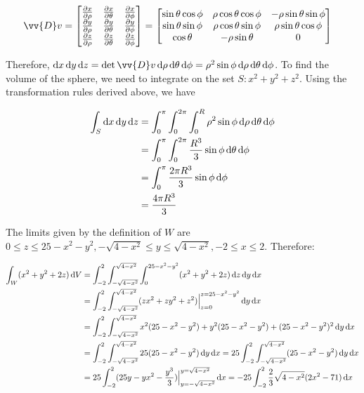 \begin{align*}
  \vv{D}v = \begin{bmatrix}
    \frac{\partial x}{\partial \rho} & \frac{\partial x}{\partial \theta} & \frac{\partial x}{\partial \phi} \\
    \frac{\partial y}{\partial \rho} & \frac{\partial y}{\partial \theta} & \frac{\partial y}{\partial \phi} \\
    \frac{\partial z}{\partial \rho} & \frac{\partial z}{\partial \theta} & \frac{\partial z}{\partial \phi}
  \end{bmatrix}
  &=
  \begin{bmatrix}
    \sin\theta \cos\phi & \rho \cos\theta \cos\phi & -\rho \sin\theta \sin\phi \\
    \sin\theta \sin\phi & \rho \cos\theta \sin\phi & \rho \sin\theta \cos\phi \\
    \cos\theta & -\rho \sin\theta & 0
  \end{bmatrix}
\end{align*}

Therefore, $\diff x \diff y \diff z = \detm \vv{D}v \diff \rho \diff \theta \diff \phi = \rho^2 \sin\phi \diff \rho \diff \theta \diff \phi$. To find the volume of the sphere, we need to integrate on the set $S: x^2 + y^2 + z^2$. Using the transformation rules derived above, we have

\begin{align*}
  \int_S \diff x \diff y \diff z &= \int_0^{\pi} \int_0^{2\pi} \int_0^R \rho^2 \sin\phi \diff \rho \diff \theta \diff \phi \\
  &= \int_0^{\pi} \int_0^{2\pi} \frac{R^3}{3} \sin\phi \diff \theta \diff \phi \\
  &= \int_0^{\pi} \frac{2\pi R^3}{3} \sin\phi \diff \phi \\
  &= \frac{4\pi R^3}{3}
\end{align*}


The limits given by the definition of $W$ are $0 \leq z \leq 25 - x^2 - y^2, -\sqrt{4 - x^2} \leq y \leq \sqrt{4 - x^2}, -2 \leq x \leq 2$. Therefore:

\begin{align*}
  \int_W (x^2 + y^2 + 2z) \diff V &= \int_{-2}^2 \int_{-\sqrt{4 - x^2}}^{\sqrt{4 - x^2}} \int_0^{25 - x^2 - y^2} (x^2 + y^2 + 2z) \diff z \diff y \diff x \\
  &= \int_{-2}^2 \int_{-\sqrt{4 - x^2}}^{\sqrt{4 - x^2}} (zx^2 + zy^2 + z^2)\Big|_{z = 0}^{z = 25 - x^2 - y^2} \diff y \diff x \\
  &= \int_{-2}^2 \int_{-\sqrt{4 - x^2}}^{\sqrt{4 - x^2}} x^2(25 - x^2 - y^2) + y^2(25 - x^2 - y^2) + (25 - x^2 - y^2)^2 \diff y \diff x \\
  &= \int_{-2}^2 \int_{-\sqrt{4 - x^2}}^{\sqrt{4 - x^2}} 25(25 - x^2 - y^2) \diff y \diff x = 25 \int_{-2}^2 \int_{-\sqrt{4 - x^2}}^{\sqrt{4 - x^2}} (25 - x^2 - y^2) \diff y \diff x \\
  &= 25 \int_{-2}^2 (25y - yx^2 - \frac{y^3}{3}) \Big|_{y = -\sqrt{4 - x^2}}^{y = \sqrt{4 - x^2}} \diff x = -25 \int_{-2}^2 \frac{2}{3}\sqrt{4 - x^2}(2x^2 - 71) \diff x \\
\end{align*}

